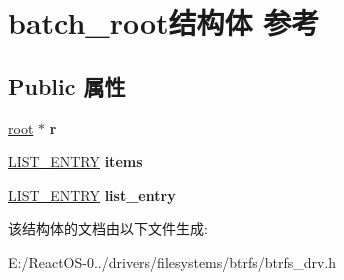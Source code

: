 \hypertarget{structbatch__root}{}\section{batch\+\_\+root结构体 参考}
\label{structbatch__root}
\subsection*{Public 属性}
\begin{DoxyCompactItemize}
\item 
\mbox{\label{structbatch__root_a05fef90de7d4866f736157be84509e19}} 
\hyperlink{struct__root}{root} $\ast$ {\bfseries r}
\item 
\mbox{\label{structbatch__root_a198945cf49ed4a586cbdee626b636928}} 
\hyperlink{struct___l_i_s_t___e_n_t_r_y}{L\+I\+S\+T\+\_\+\+E\+N\+T\+RY} {\bfseries items}
\item 
\mbox{\label{structbatch__root_abd58569ea5a5b13230e130de4b2a91ac}} 
\hyperlink{struct___l_i_s_t___e_n_t_r_y}{L\+I\+S\+T\+\_\+\+E\+N\+T\+RY} {\bfseries list\+\_\+entry}
\end{DoxyCompactItemize}


该结构体的文档由以下文件生成\+:\begin{DoxyCompactItemize}
\item 
E\+:/\+React\+O\+S-\/0../drivers/filesystems/btrfs/btrfs\+\_\+drv.\+h\end{DoxyCompactItemize}
